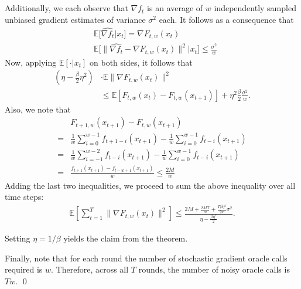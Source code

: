 \documentclass{article}
\begin{document}
\begin{appendix}
 Additionally, we each observe that $\widehat{\nabla f_t}$ is an average of $w$ independently sampled unbiased gradient estimates of variance $\sigma^2$ each. It follows as a consequence that
 \begin{align*}
 & \mathbb{E} \big[ \widehat{\nabla f_{t}} \big| x_t\big] = \nabla F_{t,w}(x_t)\\
 & \mathbb{E} \big[ \|\widehat{\nabla f_{t}} - \nabla F_{t,w}(x_t) \|^2 \big| x_t \big] \leq \frac{\sigma^2}{w}
 \end{align*}
 Now, applying $\mathbb{E}\left[\cdot|x_t\right]$ on both sides, it follows that
 \begin{align*}
\left(\eta-\frac{\beta}{2}\eta^2\right) &\cdot \mathbb{E}\|\nabla F_{t,w}(x_t)\|^2 \\
 &\leq \mathbb{E}\left[F_{t,w}(x_t)-F_{t,w}(x_{t+1}) \right]+ \eta^2\frac{\beta}{2}  \frac{\sigma^2}{w}.
 \end{align*}
 Also, we note that
\begin{align*}
&F_{t+1,w}(x_{t+1}) - F_{t,w}(x_{t+1})\\
 =& \frac{1}{w}\sum_{i=0}^{w-1} f_{t+1-i}(x_{t+1}) - \frac{1}{w}\sum_{i=0}^{w-1} f_{t-i}(x_{t+1}) \\
=& \frac{1}{w}\sum_{i=-1}^{w-2} f_{t-i}(x_{t+1}) - \frac{1}{w}\sum_{i=0}^{w-1} f_{t-i}(x_{t+1}) \\
=& \frac{f_{t+1}(x_{t+1}) - f_{t-w+1}(x_{t+1})}{w} \leq \frac{2M}{w} 
\end{align*}
Adding the last two inequalities, we proceed to sum the above inequality over all time steps:
 \begin{align*}
 \mathbb{E} \left[\sum_{t=1}^T \|\nabla F_{t,w}(x_t)\|^2 \right] \leq \frac{2M + \frac{2MT}{w}+ \frac{T\beta \eta^2}{2w} \sigma^2}{\eta - \frac{\beta \eta^2}{2}}.
 \end{align*}

Setting $\eta = 1/\beta$ yields the claim from the theorem.

Finally, note that for each round the number of stochastic gradient oracle calls required is $w$. Therefore, across all $T$ rounds, the number of noisy oracle calls is $Tw$. \qed 

\end{appendix}
\end{document}
